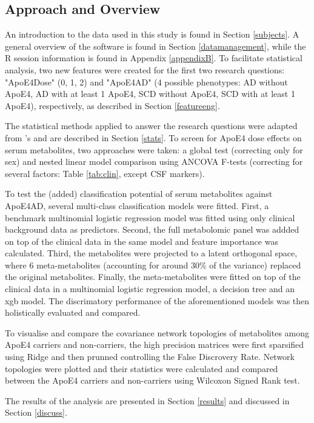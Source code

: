\documentclass{amsart}
\begin{document}
\subsection{Approach and Overview}
An introduction to the data used in this study is found in Section \ref{subjects}. A general overview of the software is found in Section \ref{datamanagement}, while the R session information is found in Appendix \ref{appendixB}. To facilitate statistical analysis, two new features were created for the first two research questions: "ApoE4Dose" (0, 1, 2) and "ApoE4AD" (4 possible phenotypes: AD without ApoE4, AD with at least 1 ApoE4, SCD without ApoE4, SCD with at least 1 ApoE4), respectively, as described in Section \ref{featureeng}.

The statistical methods applied to answer the research questions were adapted from 's  and are described in Section \ref{stats}. To screen for ApoE4 dose effects on serum metabolites, two approaches were taken: a global test (correcting only for sex) and nested linear model comparison using ANCOVA F-tests (correcting for several factors: Table \ref{tab:clin}, except CSF markers). 

To test the (added) classification potential of serum metabolites against ApoE4AD, several multi-class classification models were fitted. First, a benchmark multinomial logistic regression model was fitted using only clinical background data as predictors. Second, the full metabolomic panel was addded on top of the clinical data in the same model and feature importance was calculated. Third, the metabolites were projected to a latent orthogonal space, where 6 meta-metabolites (accounting for around 30\% of the variance) replaced the original metabolites. Finally, the meta-metabolites were fitted on top of the clinical data in a multinomial logistic regression model, a decision tree and an \acrfull{xgb} model. The discrimatory performance of the aforementioned models was then holistically evaluated and compared.

To visualise and compare the covariance network topologies of metabolites among ApoE4 carriers and non-carriers, the high precision matrices were first sparsified using Ridge and then prunned controlling the False Discrovery Rate. Network topologies were plotted and their statistics were calculated and compared between the ApoE4 carriers and non-carriers using Wilcoxon Signed Rank test.

The results of the analysis are presented in Section \ref{results} and discussed in Section \ref{discuss}.
\end{document}
